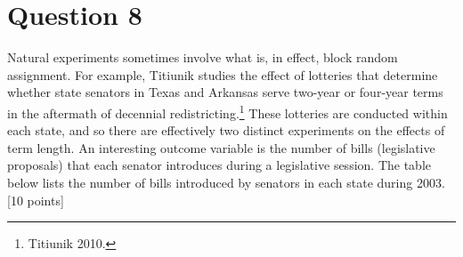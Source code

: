 \documentclass[11pt,notitlepage]{article}\usepackage[]{graphicx}\usepackage[]{color}
\begin{document}
\section{Question 8}


Natural experiments sometimes involve what is, in effect, block random assignment. For example, Titiunik studies the effect of lotteries that determine whether state senators in Texas and Arkansas serve two-year or four-year terms in the aftermath of decennial redistricting.\footnote{Titiunik 2010.} These lotteries are conducted within each state, and so there are effectively two distinct experiments on the effects of term length. An interesting outcome variable is the number of bills (legislative proposals) that each senator introduces during a legislative session. The table below lists the number of bills introduced by senators in each state during 2003. [10 points]
\end{document}
